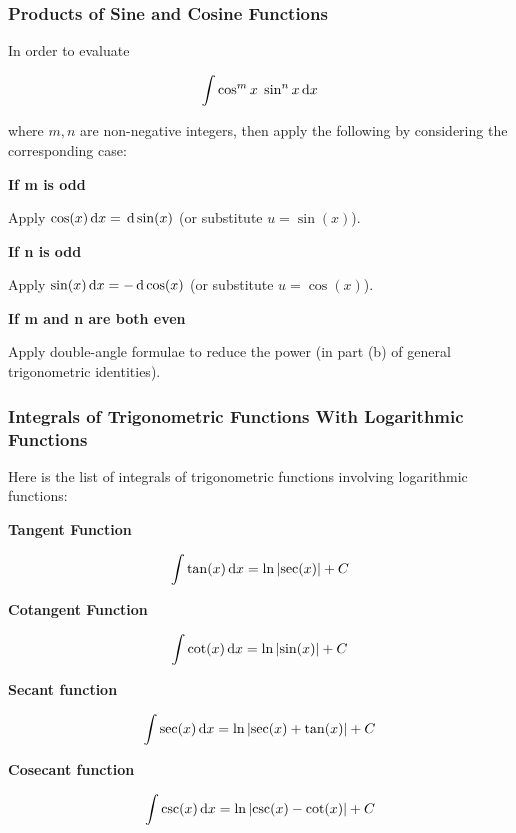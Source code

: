 \documentclass[a4paper,12pt]{article}
\begin{document}
\subsubsection{Products of Sine and Cosine Functions}
In order to evaluate

$$\int\cos^{m}x\;\sin^{n}x\,\mathrm{d} x$$\s

where $m,n$ are non-negative integers, then apply the following by considering the corresponding case:

\begin{alist}
  \item \textbf{If m is odd}\n

  Apply $\cos(x)\,\mathrm{d} x=\,\mathrm{d}\sin(x)$ (or substitute $u=\sin(x)$).

  \item \textbf{If n is odd}\n

  Apply $\sin(x)\,\mathrm{d} x=-\,\mathrm{d}\cos(x)$ (or substitute $u=\cos(x)$).

  \item \textbf{If m and n are both even}\n

  Apply double-angle formulae to reduce the power (in part (b) of general trigonometric identities).
\end{alist}

\subsubsection{Integrals of Trigonometric Functions With Logarithmic Functions}
Here is the list of integrals of trigonometric functions involving logarithmic functions:

\begin{alist}
  \item \textbf{Tangent Function}\n

  $$\int\tan(x)\,\mathrm{d} x=\ln\left| \sec(x)\right|+C$$

  \item \textbf{Cotangent Function}\n

  $$\int\cot(x)\,\mathrm{d} x=\ln\left| \sin(x)\right|+C$$

  \item \textbf{Secant function}\n

  $$\int\sec(x)\,\mathrm{d} x=\ln\left| \sec(x)+\tan(x)\right|+C$$

  \item \textbf{Cosecant function}\n

  $$\int\csc(x)\,\mathrm{d} x=\ln\left| \csc(x)-\cot(x)\right|+C$$
\end{alist}
\end{document}
